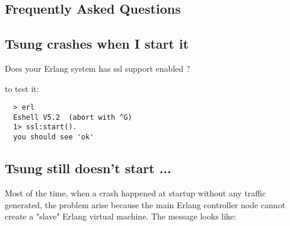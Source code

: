 \documentclass{IDXDOC-en}
\begin{document}
\begin{appendix}

\section{Frequently Asked Questions}

\subsection{Tsung crashes when I start it }

Does your Erlang system has ssl support enabled ?

to test it:
\begin{Verbatim}
  > erl
  Eshell V5.2  (abort with ^G)
  1> ssl:start().
  you should see 'ok'
\end{Verbatim}

\subsection{Tsung still doesn't start ...}

Most of the time, when a crash happened at startup without any traffic
generated, the problem arise because the main Erlang controller node cannot
create a "slave" Erlang virtual machine. The message looks like:


\end{appendix}
\end{document}
